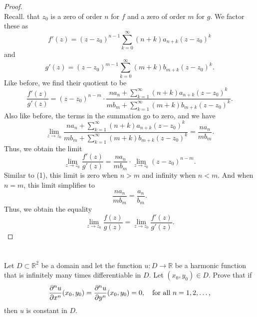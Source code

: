 \documentclass[12pt]{article}
\newenvironment{problem}
    {\begin{lrbox}{\mybox}\begin{minipage}{0.98\textwidth}}
    {\end{minipage}\end{lrbox}\framebox[\textwidth]{\usebox{\mybox}}}
\newcommand{\ds}{\displaystyle}
\newcommand{\R}{\mathbb{R}}
\newcommand{\pd}[3][1]{\ifx1#1{\frac{\partial #2}{\partial#3}}\else{\frac{\partial^{#1}#2}{\partial#3^{#1}}}\fi}
\begin{document}
\begin{proof}
\[    \]
    Recall. that $z_0$ is a zero of order $n$ for $f$ and a zero of order $m$ for $g$. We factor these as
    \[
        f'(z) = (z - z_0)^{n-1} \sum_{k=0}^\infty (n+k) a_{n+k} (z - z_0)^k
    \]
    and
    \[
        g'(z) = (z - z_0)^{m-1} \sum_{k=0}^\infty (m+k) b_{m+k} (z - z_0)^k.
    \]
    Like before, we find their quotient to be
    \[
        \frac{f'(z)}{g'(z)} = (z - z_0)^{n-m} \cdot \frac{n a_n + \ds\sum_{k=1}^\infty (n+k) a_{n+k} (z - z_0)^k}{m b_m + \ds\sum_{k=1}^\infty (m+k) b_{m+k} (z - z_0)^k}.
    \]
    Also like before, the terms in the summation go to zero, and we have
    \[
        \lim_{z \to z_0} \frac{na_n + \ds\sum_{k=1}^\infty (n+k) a_{n+k} (z - z_0)^k}{mb_m + \ds\sum_{k=1}^\infty (m+k) b_{m+k} (z - z_0)^k} = \frac{n a_n}{m b_m}.
    \]
    Thus, we obtain the limit
    \[
        \lim_{z \to z_0} \frac{f'(z)}{g'(z)} = \frac{n a_n}{m b_m} \cdot \lim_{z \to z_0} (z - z_0)^{n-m}.
    \]
    Similar to (1), this limit is zero when $n > m$ and infinity when $n < m$. And when $n = m$, this limit simplifies to
    \[
        \frac{n a_n}{m b_m} = \frac{a_n}{b_m}.
    \]
    Thus, we obtain the equality
    \[
        \lim_{z \to z_0} \frac{f(z)}{g(z)} = \lim_{z \to z_0} \frac{f'(z)}{g'(z)}.
    \]
    

\end{proof}

\newpage
\section{}
\begin{problem}
    Let $D \subset \R^2$ be a domain and let the function $u : D \to \R$ be a harmonic function that is infinitely many times differentiable in $D$. Let $(x_0, y_0) \in D$. Prove that if
    \[
        \pd[n]{u}{x}(x_0, y_0) = \pd[n]{u}{y}(x_0, y_0) = 0, \quad\text{for all $n = 1, 2, \dots$,}
    \]
    then $u$ is constant in $D$.
\end{problem}
\end{document}

